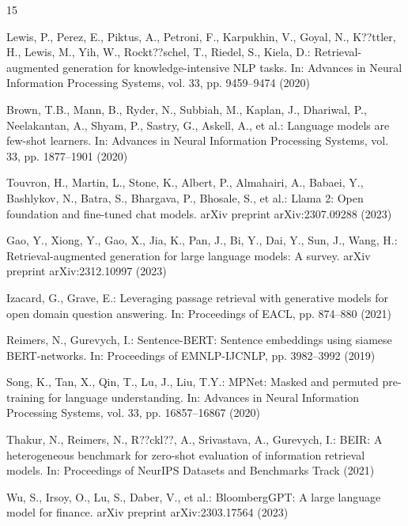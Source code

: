 \documentclass[runningheads]{llncs}
\begin{document}

\begin{thebibliography}{15}

Lewis, P., Perez, E., Piktus, A., Petroni, F., Karpukhin, V., Goyal, N., K??ttler, H., Lewis, M., Yih, W., Rockt??schel, T., Riedel, S., Kiela, D.: Retrieval-augmented generation for knowledge-intensive NLP tasks. In: Advances in Neural Information Processing Systems, vol. 33, pp. 9459--9474 (2020)

Brown, T.B., Mann, B., Ryder, N., Subbiah, M., Kaplan, J., Dhariwal, P., Neelakantan, A., Shyam, P., Sastry, G., Askell, A., et al.: Language models are few-shot learners. In: Advances in Neural Information Processing Systems, vol. 33, pp. 1877--1901 (2020)

Touvron, H., Martin, L., Stone, K., Albert, P., Almahairi, A., Babaei, Y., Bashlykov, N., Batra, S., Bhargava, P., Bhosale, S., et al.: Llama 2: Open foundation and fine-tuned chat models. arXiv preprint arXiv:2307.09288 (2023)

Gao, Y., Xiong, Y., Gao, X., Jia, K., Pan, J., Bi, Y., Dai, Y., Sun, J., Wang, H.: Retrieval-augmented generation for large language models: A survey. arXiv preprint arXiv:2312.10997 (2023)

Izacard, G., Grave, E.: Leveraging passage retrieval with generative models for open domain question answering. In: Proceedings of EACL, pp. 874--880 (2021)

Reimers, N., Gurevych, I.: Sentence-BERT: Sentence embeddings using siamese BERT-networks. In: Proceedings of EMNLP-IJCNLP, pp. 3982--3992 (2019)

Song, K., Tan, X., Qin, T., Lu, J., Liu, T.Y.: MPNet: Masked and permuted pre-training for language understanding. In: Advances in Neural Information Processing Systems, vol. 33, pp. 16857--16867 (2020)

Thakur, N., Reimers, N., R??ckl??, A., Srivastava, A., Gurevych, I.: BEIR: A heterogeneous benchmark for zero-shot evaluation of information retrieval models. In: Proceedings of NeurIPS Datasets and Benchmarks Track (2021)

Wu, S., Irsoy, O., Lu, S., Daber, V., et al.: BloombergGPT: A large language model for finance. arXiv preprint arXiv:2303.17564 (2023)


\end{thebibliography}
\end{document}
